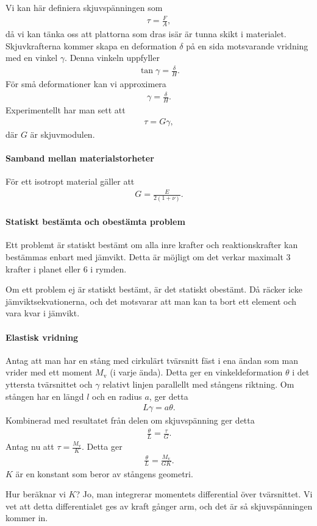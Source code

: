 Vi kan här definiera skjuvspänningen som
\begin{align*}
	\tau = \frac{F}{A},
\end{align*}
då vi kan tänka oss att plattorna som dras isär är tunna skikt i materialet. Skjuvkrafterna kommer skapa en deformation $\delta$ på en sida motsvarande vridning med en vinkel $\gamma$. Denna vinkeln uppfyller
\begin{align*}
	\tan{\gamma} = \frac{\delta}{H}.
\end{align*}
För små deformationer kan vi approximera
\begin{align*}
	\gamma = \frac{\delta}{H}.
\end{align*}
Experimentellt har man sett att
\begin{align*}
	\tau = G\gamma,
\end{align*}
där $G$ är skjuvmodulen.

\paragraph{Samband mellan materialstorheter}
För ett isotropt material gäller att
\begin{align*}
	G = \frac{E}{2(1 + \nu)}.
\end{align*}

\paragraph{Statiskt bestämta och obestämta problem}
Ett problemt är statiskt bestämt om alla inre krafter och reaktionskrafter kan bestämmas enbart med jämvikt. Detta är möjligt om det verkar maximalt $3$ krafter i planet eller $6$ i rymden.

Om ett problem ej är statiskt bestämt, är det statiskt obestämt. Då räcker icke jämviktsekvationerna, och det motsvarar att man kan ta bort ett element och vara kvar i jämvikt.

\paragraph{Elastisk vridning}
Antag att man har en stång med cirkulärt tvärsnitt fäst i ena ändan som man vrider med ett moment $M_{\text{v}}$ (i varje ända). Detta ger en vinkeldeformation $\theta$ i det yttersta tvärsnittet och $\gamma$ relativt linjen parallellt med stångens riktning. Om stången har en längd $l$ och en radius $a$, ger detta
\begin{align*}
	L\gamma = a\theta.
\end{align*}
Kombinerad med resultatet från delen om skjuvspänning ger detta
\begin{align*}
	\frac{\theta}{L} = \frac{\tau}{G}.
\end{align*}
Antag nu att $\tau = \frac{M_{\text{v}}}{K}$. Detta ger
\begin{align*}
	\frac{\theta}{L} = \frac{M_{\text{v}}}{GK}.
\end{align*}
$K$ är en konstant som beror av stångens geometri.

Hur beräknar vi $K$? Jo, man integrerar momentets differential över tvärsnittet. Vi vet att detta differentialet ges av kraft gånger arm, och det är så skjuvspänningen kommer in.